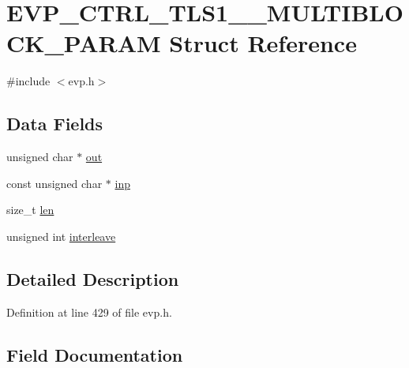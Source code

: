 \hypertarget{struct_e_v_p___c_t_r_l___t_l_s1__1___m_u_l_t_i_b_l_o_c_k___p_a_r_a_m}{}\section{E\+V\+P\+\_\+\+C\+T\+R\+L\+\_\+\+T\+L\+S1\+\_\+\_\+\+M\+U\+L\+T\+I\+B\+L\+O\+C\+K\+\_\+\+P\+A\+R\+AM Struct Reference}
\label{struct_e_v_p___c_t_r_l___t_l_s1__1___m_u_l_t_i_b_l_o_c_k___p_a_r_a_m}


{\ttfamily \#include $<$evp.\+h$>$}

\subsection*{Data Fields}
\begin{DoxyCompactItemize}
\item 
unsigned char $\ast$ \hyperlink{struct_e_v_p___c_t_r_l___t_l_s1__1___m_u_l_t_i_b_l_o_c_k___p_a_r_a_m_aa061f4210282e8119ba445855769c646}{out}
\item 
const unsigned char $\ast$ \hyperlink{struct_e_v_p___c_t_r_l___t_l_s1__1___m_u_l_t_i_b_l_o_c_k___p_a_r_a_m_af20c2b71820b9a795c42d14c000d26f7}{inp}
\item 
size\+\_\+t \hyperlink{struct_e_v_p___c_t_r_l___t_l_s1__1___m_u_l_t_i_b_l_o_c_k___p_a_r_a_m_a7360b55975153b822efc5217b7734e6a}{len}
\item 
unsigned int \hyperlink{struct_e_v_p___c_t_r_l___t_l_s1__1___m_u_l_t_i_b_l_o_c_k___p_a_r_a_m_a457dc3279df296fd7d71294877603ee0}{interleave}
\end{DoxyCompactItemize}


\subsection{Detailed Description}


Definition at line 429 of file evp.\+h.



\subsection{Field Documentation}
